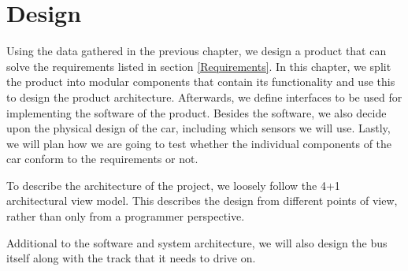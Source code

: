 \chapter{Design}

Using the data gathered in the previous chapter, we design a product that can solve the requirements listed in section \ref{Requirements}. In this chapter, we split the product into modular components that contain its functionality and use this to design the product architecture. Afterwards, we define interfaces to be used for implementing the software of the product. Besides the software, we also decide upon the physical design of the car, including which sensors we will use. Lastly, we will plan how we are going to test whether the individual components of the car conform to the requirements or not.

To describe the architecture of the project, we loosely follow the 4+1 architectural view model. This describes the design from different points of view, rather than only from a programmer perspective. 

Additional to the software and system architecture, we will also design the bus itself along with the track that it needs to drive on. 








